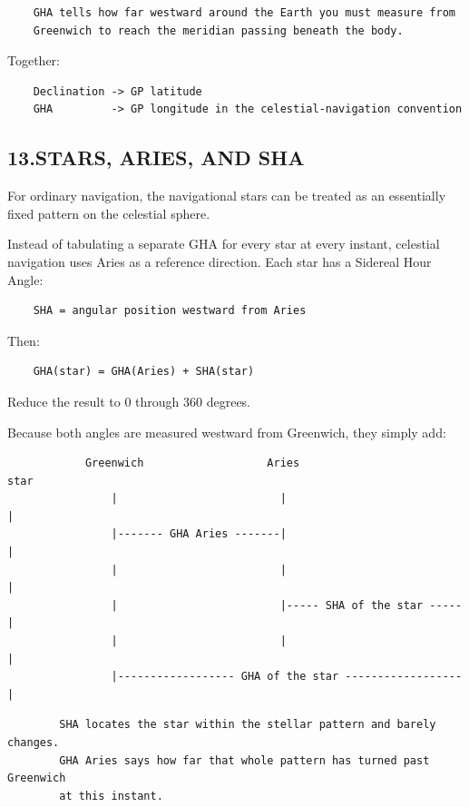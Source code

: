 \documentclass[11pt]{article}
\begin{document}
\begin{verbatim}
    GHA tells how far westward around the Earth you must measure from
    Greenwich to reach the meridian passing beneath the body.
\end{verbatim}

Together:

\begin{verbatim}
    Declination -> GP latitude
    GHA         -> GP longitude in the celestial-navigation convention
\end{verbatim}

\subsection*{13.\quad STARS, ARIES, AND SHA}

For ordinary navigation, the navigational stars can be treated as an essentially fixed pattern on the celestial sphere.

Instead of tabulating a separate GHA for every star at every instant, celestial navigation uses Aries as a reference direction. Each star has a Sidereal Hour Angle:

\begin{verbatim}
    SHA = angular position westward from Aries
\end{verbatim}

Then:

\begin{verbatim}
    GHA(star) = GHA(Aries) + SHA(star)
\end{verbatim}

Reduce the result to 0 through 360 degrees.

Because both angles are measured westward from Greenwich, they simply add:

\begin{verbatim}
            Greenwich                   Aries                       star
                |                         |                           |
                |------- GHA Aries -------|                           |
                |                         |                           |
                |                         |----- SHA of the star -----|
                |                         |                           |
                |------------------ GHA of the star ------------------|
\end{verbatim}

\begin{verbatim}
        SHA locates the star within the stellar pattern and barely changes.
        GHA Aries says how far that whole pattern has turned past Greenwich
        at this instant.
\end{verbatim}
\end{document}
